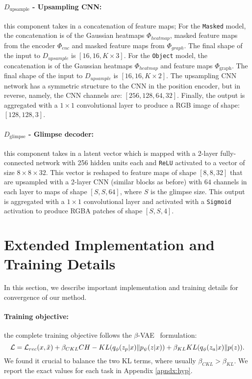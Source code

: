 \documentclass[nohyperref]{article}
\theoremstyle{plain}
\theoremstyle{definition}
\theoremstyle{remark}
\newcommand{\dgraph}{\Phi_{\textrm{graph}}}
\newcommand{\dglimpse}{D_{\textrm{glimpse}}}
\newcommand{\dupsample}{D_{\textrm{upsample}}}
\begin{document}
\paragraph{$\dupsample$ - Upsampling CNN:} this component takes in a concatenation of feature maps; For the \texttt{Masked} model, the concatenation is of the Gaussian heatmaps $\Phi_{heatmap}$, masked feature maps from the encoder $\Phi_{enc}$ and masked feature maps from $\Phi_{graph}$. The final shape of the input to $D_{upsample}$ is $[16, 16, K\times3]$. For the \texttt{Object} model, the concatenation is of the Gaussian heatmaps $\Phi_{heatmap}$ and feature maps $\dgraph$. The final shape of the input to $D_{upsample}$ is $[16, 16, K\times2]$.
The upsampling CNN network has a symmetric structure to the CNN in the position encoder, but in reverse, namely, the CNN channels are: $[256, 128, 64, 32]$. Finally, the output is aggregated with a $1\times 1$ convolutional layer to produce a RGB image of shape: $[128, 128, 3]$.

\paragraph{$\dglimpse$ - Glimpse decoder:} this component takes in a latent vector which is mapped with a 2-layer fully-connected network with 256 hidden units each and \texttt{ReLU} activated to a vector of size $8\times8\times32$. This vector is reshaped to feature maps of shape $[8, 8, 32]$ that are upsampled with a 2-layer CNN (similar blocks as before) with $64$ channels in each layer to maps of shape $[S, S, 64]$, where $S$ is the glimpse size. This output is aggregated with a $1\times1$ convolutional layer and activated with a \texttt{Sigmoid} activation to produce RGBA patches of shape $[S, S, 4]$.

\section{Extended Implementation and Training Details}
\label{apndx:impl}
In this section, we describe important implementation and training details for convergence of our method.
\paragraph{Training objective:} the complete training objective follows the $\beta$-VAE~\citep{higgins2017beta} formulation: $$ \mathcal{L} =  \mathcal{L}_{rec}(x, \Tilde{x}) +\beta_{CKL}CH-KL(q_{\phi}(z_p|x)\Vert p_{\psi}(z|x)) + \beta_{KL} KL(q_{\phi}(z_a|x) \Vert p(z)).$$ We found it crucial to balance the two KL terms, where usually $\beta_{CKL} > \beta_{KL}$. We report the exact values for each task in Appendix \ref{apndx:hyp}.
\end{document}
